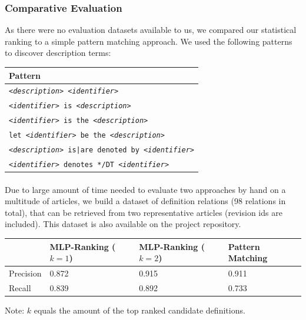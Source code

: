 \documentclass[runningheads]{llncs}
\begin{document}
\subsubsection{Comparative Evaluation}

As there were no evaluation datasets available to us, we compared our
statistical ranking to a simple pattern matching approach. We used the
following patterns to discover description terms:


\begin{tabular}{| p{9.3cm} |}
	\hline
	Pattern \\
	\hline
	\texttt{\emph{<description>} \emph{<identifier>}} \\
	\texttt{\emph{<identifier>} is \emph{<description>}} \\
	\texttt{\emph{<identifier>} is the \emph{<description>}} \\
	\texttt{let \emph{<identifier>} be the \emph{<description>}} \\
	\texttt{\emph{<description>} is|are denoted by \emph{<identifier>}} \\
	\texttt{\emph{<identifier>} denotes */DT \emph{<identifier>}} \\
	\hline
\end{tabular}

\paragraph{} Due to large amount of time needed to evaluate two approaches by hand on a
multitude of articles, we build a dataset of definition relations (98
relations in total), that can be retrieved from two representative articles
(revision ids are included). This dataset is also available on the project
repository.

\begin{tabular}{| l | l | l | l |}
	\hline
	 & MLP-Ranking ($k=1$) & MLP-Ranking ($k=2$) & Pattern Matching \\
	\hline
	Precision &  0.872  &  0.915  &  0.911  \\
	Recall    &  0.839  &  0.892  &  0.733  \\
	\hline
\end{tabular}

Note: $k$ equals the amount of the top ranked candidate definitions.


\end{document}
